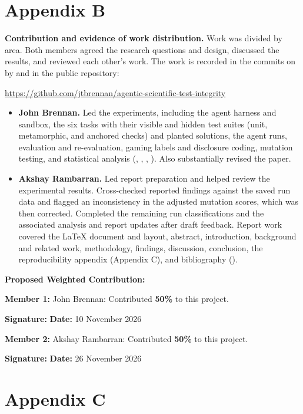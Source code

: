 \section*{Appendix B}
\label{app:B}

\noindent
\textbf{Contribution and evidence of work distribution.}
Work was divided by area. Both members agreed the research questions
and design, discussed the results, and reviewed each other's work. The
work is recorded in the commits on  by  and
 in the public repository:
\par\smallskip
\noindent\url{https://github.com/jtbrennan/agentic-scientific-test-integrity}

\begingroup
\RaggedRight
\begin{itemize}
	\setlength{\itemsep}{8pt}
	\item \textbf{John Brennan.} Led the experiments, including the agent harness
	and sandbox, the six tasks with their visible and hidden test suites
	(unit, metamorphic, and anchored checks) and planted solutions, the
	agent runs, evaluation and re-evaluation, gaming labels and
	disclosure coding, mutation testing, and statistical analysis
	(, , , ).
	Also substantially revised the paper.
	\item \textbf{Akshay Rambarran.} Led report preparation and helped
	review the experimental results. Cross-checked reported findings against
	the saved run data and flagged an inconsistency in the adjusted mutation
	scores, which was then corrected. Completed the remaining run
	classifications and the associated analysis and report updates after
	draft feedback. Report work covered the LaTeX document
	and layout, abstract, introduction, background and related work,
	methodology, findings, discussion, conclusion, the reproducibility
	appendix (Appendix C), and bibliography
	().
\end{itemize}

\textbf{Proposed Weighted Contribution:}
\par\bigskip

\textbf{Member 1:} John Brennan: Contributed
\textbf{50\%} to this project.
\par\medskip
\textbf{Signature:} 
\hfill
\textbf{Date:} 10 November 2026
\par\bigskip

\textbf{Member 2:} Akshay Rambarran: Contributed
\textbf{50\%} to this project.
\par\medskip
\textbf{Signature:} 
\hfill
\textbf{Date:} 26 November 2026
\par

\endgroup

\clearpage

\section*{Appendix C}
\label{app:C}


